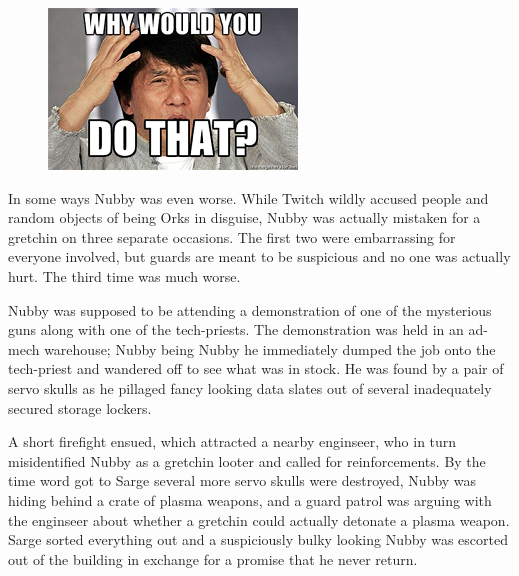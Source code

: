 \begin{figure}
	\begin{center}
		\includegraphics[width=\figwidth]{pics/4/12.png}
	\end{center}
\end{figure}
In some ways Nubby was even worse. 
While Twitch wildly accused people and random objects of being Orks in disguise, Nubby was actually mistaken for a gretchin on three separate occasions. 
The first two were embarrassing for everyone involved, but guards are meant to be suspicious and no one was actually hurt. The third time was much worse.

Nubby was supposed to be attending a demonstration of one of the mysterious guns along with one of the tech-priests. 
The demonstration was held in an ad-mech warehouse; 
Nubby being Nubby he immediately dumped the job onto the tech-priest and wandered off to see what was in stock. 
He was found by a pair of servo skulls as he pillaged fancy looking data slates out of several inadequately secured storage lockers.

A short firefight ensued, which attracted a nearby enginseer, who in turn misidentified Nubby as a gretchin looter and called for reinforcements. 
By the time word got to Sarge several more servo skulls were destroyed, Nubby was hiding behind a crate of plasma weapons, and a guard patrol was arguing with the enginseer about whether a gretchin could actually detonate a plasma weapon. 
Sarge sorted everything out and a suspiciously bulky looking Nubby was escorted out of the building in exchange for a promise that he never return.

